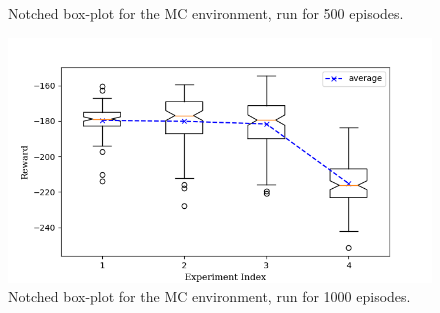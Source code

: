 \documentclass[hidelinks,journal]{IEEEtran}
\begin{document}
\begin{figure}[p]
  \caption{Notched box-plot for the MC environment, run for 500 episodes.}
  \label{fig:mc3ResBox}
  \includegraphics[scale=0.45]{graph/mcEvalBox.png}
  \caption{Notched box-plot for the MC environment, run for 1000 episodes.}
  \label{fig:mc4ResBox}
\end{figure}
\end{document}
